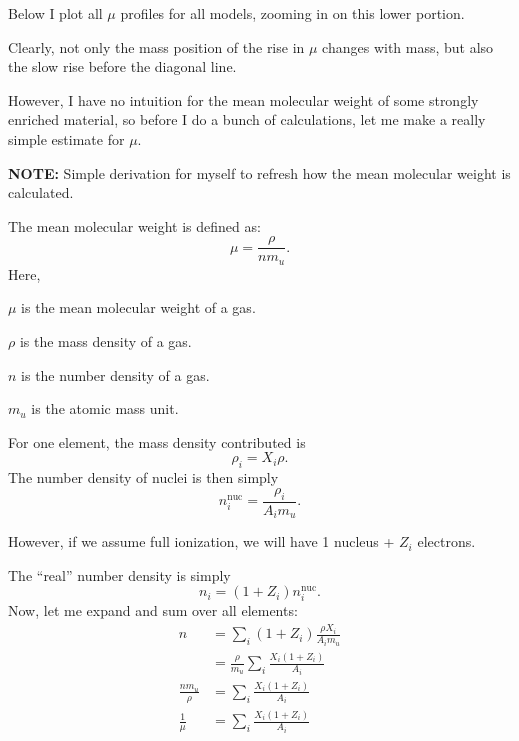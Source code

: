 \documentclass[a4paper,10pt]{article}
\begin{document}
Below I plot all \(\mu\) profiles for all models, zooming in on this lower portion.

\begin{figure}[ht]
    \centering
\end{figure}

Clearly, not only the mass position of the rise in \(\mu\) changes with mass, but also
the slow rise before the diagonal line.

However, I have no intuition for the mean molecular weight of some strongly enriched material,
so before I do a bunch of calculations, let me make a really simple estimate for \(\mu\).
\begin{questionbox}{}{}
\textbf{\textcolor{keywordscolor}{NOTE:}}
    Simple derivation for myself to refresh how the mean molecular weight is calculated.
\end{questionbox}

The mean molecular weight is defined as:
\begin{equation*}
\mu = \frac{\rho}{nm_{u}}.
\end{equation*}
Here,
\begin{citemize}
    \item  \(\mu\) is the mean molecular weight of a gas.
    \item  \(\rho \) is the mass density of a gas.
    \item  \(n\) is the number density of a gas.
    \item  \(m_{u}\) is the atomic mass unit.
\end{citemize}

For one element, the mass density contributed is
\begin{equation*}
    \rho_{i} = X_{i} \rho.
\end{equation*}
The number density of nuclei is then simply
\begin{equation*}
    n_{i}^\textrm{nuc}  = \frac{\rho_{i}}{A_{i}m_{u}}  .
\end{equation*}

However, if we assume full ionization, we will have 1 nucleus + \(Z_{i} \) electrons.

The ``real'' number density is simply
\begin{equation*}
    n_{i} = (1 + Z_{i})n_{i}^\textrm{nuc}.
\end{equation*}
Now, let me expand and sum over all elements:
\begin{align*}
    n &= \sum_{i} (1 + Z_{i})\frac{\rho X_{i}}{A_{i}m_{u}}\\
      &= \frac{\rho}{m_{u} }\sum_{i} \frac{X_{i}(1 + Z_{i})}{A_{i}}\\
    \frac{nm_{u} }{\rho } &= \sum_{i} \frac{X_{i}(1 + Z_{i})}{A_{i}}\\
    \frac{1}{\mu} &= \sum_{i} \frac{X_{i}(1 + Z_{i})}{A_{i}}\\
\end{align*}
\end{document}
